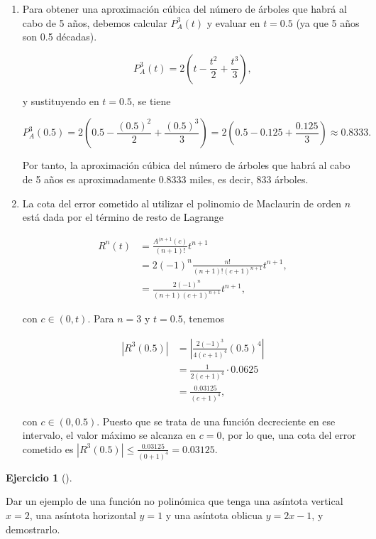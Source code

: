 \documentclass[
  spanish,
  a4paper,
]{scrreport}
\theoremstyle{definition}
\newtheorem{exercise}{Ejercicio}[chapter]
\theoremstyle{remark}
\begin{document}
\begin{tcolorbox}
\begin{enumerate}
  de manera que el polinomio de nuestra función será igual pero
  multiplicado por 2, es decir,

  \[
  P_A^n(t) = 2\left(t - \frac{t^2}{2} + \frac{t^3}{3} - \ldots + (-1)^{n-1}\frac{t^n}{n}\right) = \sum_{i=1}^{n} 2(-1)^{i-1} \frac{t^i}{i}.
  \]
\item
  Para obtener una aproximación cúbica del número de árboles que habrá
  al cabo de 5 años, debemos calcular \(P_A^3(t)\) y evaluar en
  \(t = 0.5\) (ya que 5 años son 0.5 décadas).

  \[
  P_A^3(t) = 2\left(t - \frac{t^2}{2} + \frac{t^3}{3}\right),
  \]

  y sustituyendo en \(t = 0.5\), se tiene

  \[
  P_A^3(0.5) = 2\left(0.5 - \frac{(0.5)^2}{2} + \frac{(0.5)^3}{3}\right) = 2\left(0.5 - 0.125 + \frac{0.125}{3}\right) \approx 0.8333.
  \]

  Por tanto, la aproximación cúbica del número de árboles que habrá al
  cabo de 5 años es aproximadamente 0.8333 miles, es decir, 833 árboles.
\item
  La cota del error cometido al utilizar el polinomio de Maclaurin de
  orden \(n\) está dada por el término de resto de Lagrange

  \begin{align*}
  R^n(t) 
  &= \frac{A^{(n+1}(c)}{(n+1)!} t^{n+1}\\
  &= 2(-1)^{n} \frac{n!}{(n+1)!(c+1)^{n+1}} t^{n+1}, \\
  &= \frac{2(-1)^{n}}{(n+1)(c+1)^{n+1}} t^{n+1},
  \end{align*}

  con \(c\in (0, t)\). Para \(n=3\) y \(t=0.5\), tenemos

  \begin{align*}
  |R^3(0.5)| 
  &= \left|\frac{2(-1)^{3}}{4(c+1)^{4}} (0.5)^{4}\right| \\
  &= \frac{1}{2(c+1)^{4}} \cdot 0.0625 \\
  &= \frac{0.03125}{(c+1)^4},
  \end{align*}

  con \(c\in (0, 0.5)\). Puesto que se trata de una función decreciente
  en ese intervalo, el valor máximo se alcanza en \(c=0\), por lo que,
  una cota del error cometido es
  \(|R^3(0.5)|\leq \frac{0.03125}{(0+1)^{4}} = 0.03125\).
\end{enumerate}

\end{tcolorbox}

\begin{exercise}[]\protect\hypertarget{exr-7}{}\label{exr-7}

Dar un ejemplo de una función no polinómica que tenga una asíntota
vertical \(x=2\), una asíntota horizontal \(y=1\) y una asíntota oblicua
\(y=2x-1\), y demostrarlo.

\end{exercise}
\end{document}
